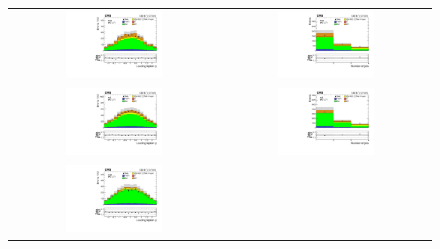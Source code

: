 \begin{figure}[tbh!]
 \begin{center}
 \begin{tabular}{cc}
 \includegraphics[width=0.48\textwidth]{figures/Part3/Selection/WZ/eee/lep1Eta}&
 \includegraphics[width=0.48\textwidth]{figures/Part3/Selection/WZ/eee/njet} \\
 \includegraphics[width=0.48\textwidth]{figures/Part3/Selection/WZ/emul/lep1Eta}&
 \includegraphics[width=0.48\textwidth]{figures/Part3/Selection/WZ/emul/njet} \\
 \includegraphics[width=0.48\textwidth]{figures/Part3/Selection/WZ/mumumu/lep1Eta}&

\end{tabular}
\end{center}
\end{figure}
